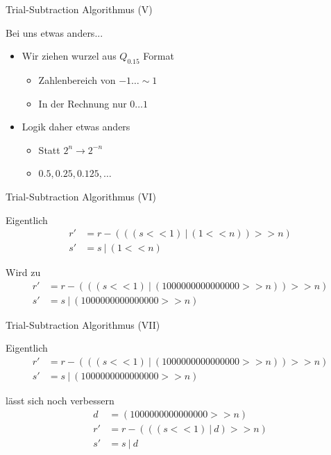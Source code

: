   \begin{frame} {Trial-Subtraction Algorithmus (V)}
    \begin{block} {Bei uns etwas anders...}
      \begin{itemize}
        \item Wir ziehen wurzel aus $Q_{0.15}$ Format
        \begin{itemize}
          \item Zahlenbereich von $-1 \dots \sim{}1$
          \item In der Rechnung nur $0 \dots 1$
        \end{itemize}
        \item Logik daher etwas anders
        \begin{itemize}
          \item Statt $2^n \rightarrow 2^{-n}$
          \item $0.5, 0.25, 0.125, \dots$
        \end{itemize}
      \end{itemize}
    \end{block}
  \end{frame}

  \begin{frame} {Trial-Subtraction Algorithmus (VI)}
    \begin{block} {Eigentlich}
      \begin{align*}
        r' &= r - (((s << 1)~|~(1 << n)) >> n) \\
        s' &= s~|~(1 << n)
      \end{align*}
    \end{block}
    \begin{exampleblock} {Wird zu}
      \begin{align*}
        r' &= r - (((s << 1)~|~(1000000000000000 >> n)) >> n) \\
        s' &= s~|~(1000000000000000 >> n)
      \end{align*}
    \end{exampleblock}
  \end{frame}

  \begin{frame} {Trial-Subtraction Algorithmus (VII)}
    \begin{block} {Eigentlich}
      \begin{align*}
        r' &= r - (((s << 1)~|~(1000000000000000 >> n)) >> n) \\
        s' &= s~|~(1000000000000000 >> n)    
      \end{align*}
    \end{block}
    \begin{exampleblock} {lässt sich noch verbessern}
      \begin{align*}
        d  &= (1000000000000000 >> n) \\
        r' &= r - (((s << 1)~|~d) >> n) \\
        s' &= s~|~d    
      \end{align*}
    \end{exampleblock}    
  \end{frame}

